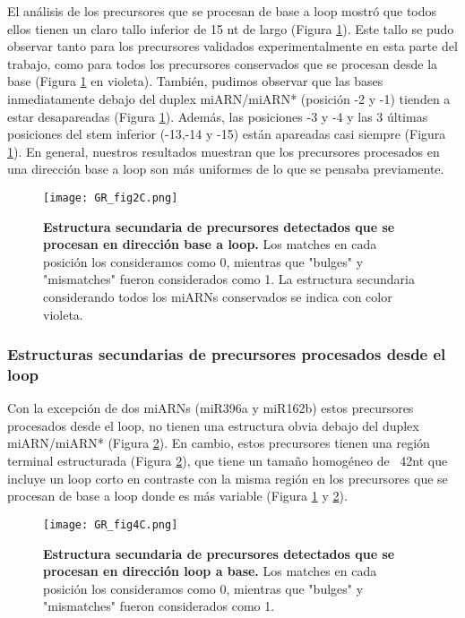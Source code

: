 El análisis de los precursores que se procesan de base a loop mostró que todos ellos tienen un claro tallo inferior de 15 nt de largo (Figura \ref{fig:GR_fig2C}).
Este tallo se pudo observar tanto para los precursores validados experimentalmente en esta parte del trabajo, como para todos los precursores conservados que se procesan desde la base (Figura \ref{fig:GR_fig2C} en violeta).
También, pudimos observar que las bases inmediatamente debajo del duplex miARN/miARN* (posición -2 y -1) tienden a estar desapareadas (Figura \ref{fig:GR_fig2C}).
Además, las posiciones -3 y -4 y las 3 últimas posiciones del stem inferior (-13,-14 y -15) están apareadas casi siempre (Figura \ref{fig:GR_fig2C}).
En general, nuestros resultados muestran que los precursores procesados en una dirección base a loop son más uniformes de lo que se pensaba previamente.

\begin{figure}[htbp!] 
    \centering    
    \texttt{[image: GR\_fig2C.png]}
    \caption[Estructura secundaria de precursores de base a loop]{
    \textbf{Estructura secundaria de precursores detectados que se procesan en dirección base a loop.}
    Los matches en cada posición los consideramos como 0, mientras que "bulges" y "mismatches" fueron considerados como 1.
    La estructura secundaria considerando todos los miARNs conservados se indica con color violeta.
    }
    \label{fig:GR_fig2C}
\end{figure}

\subsubsection{Estructuras secundarias de precursores procesados desde el loop}
Con la excepción de dos miARNs (miR396a y miR162b) estos precursores procesados desde el loop, no tienen una estructura obvia debajo del duplex miARN/miARN* (Figura \ref{fig:GR_fig4C}).
En cambio, estos precursores tienen una región terminal estructurada (Figura \ref{fig:GR_fig4C}), que tiene un tamaño homogéneo de ~42nt que incluye un loop corto en contraste con la misma región en los precursores que se procesan de base a loop donde es más variable (Figura \ref{fig:GR_fig2C} y \ref{fig:GR_fig4C}). 

\begin{figure}[htbp!] 
    \centering    
    \texttt{[image: GR\_fig4C.png]}
    \caption[Estructura secundaria de precursores de loop a base]{
   \textbf{ Estructura secundaria de precursores detectados que se procesan en dirección loop a base.}
    Los matches en cada posición los consideramos como 0, mientras que "bulges" y "mismatches" fueron considerados como 1.}
    \label{fig:GR_fig4C}
\end{figure}


